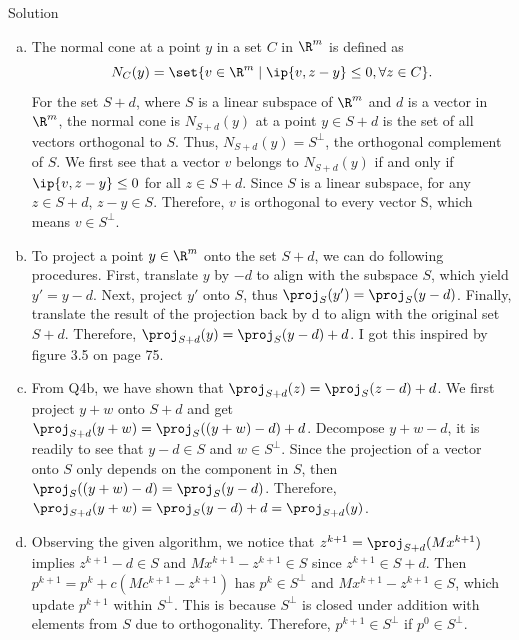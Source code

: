 \documentclass{article}
\theoremstyle{plain}
\theoremstyle{definition}
\theoremstyle{remark}
\begin{document}
\begin{solution}
    {Solution}
    \begin{enumerate}[(a)]
        \item The normal cone at a point $y$ in a set $C$ in $\R^m$ is defined as \[N_C(y)=\set{v\in\R^m \mid \ip{v, z-y}\leq 0, \forall z\in C}.\]
        For the set $S+d$, where $S$ is a linear subspace of $\R^m$ and $d$ is a vector in $\R^m$, the normal cone is $N_{S+d}(y)$ at a point $y\in S+d$ is the set of all vectors orthogonal to $S$. Thus, $N_{S+d}(y)=S^{\bot}$, the orthogonal complement of $S$. We first see that a vector $v$ belongs to $N_{S+d}(y)$ if and only if $\ip{v, z-y}\leq 0$ for all $z\in S+d$. Since $S$ is a linear subspace, for any $z\in S+d$, $z-y\in S$. Therefore, $v$ is orthogonal to every vector S, which means $v\in S^{\bot}$.
        \item To project a point $y\in\R^m$ onto the set $S+d$, we can do following procedures. First, translate $y$ by $-d$ to align with the subspace $S$, which yield $y'=y-d$. Next, project $y'$ onto $S$, thus $\proj_S(y')=\proj_S(y-d)$. Finally, translate the result of the projection back by d to align with the original set $S+d$. Therefore, $\proj_{S+d}(y)=\proj_S(y-d)+d$. I got this inspired by figure 3.5 on page 75.
        \item From Q4b, we have shown that $\proj_{S+d}(z)=\proj_S(z-d)+d$. We first project $y+w$ onto $S+d$ and get $\proj_{S+d}(y+w)=\proj_S((y+w)-d)+d$. Decompose $y+w-d$, it is readily to see that $y-d\in S$ and $w\in S^{\bot}$. Since the projection of a vector onto $S$ only depends on the component in $S$, then $\proj_S((y+w)-d)=\proj_S(y-d)$. Therefore, $\proj_{S+d}(y+w)=\proj_S(y-d)+d=\proj_{S+d}(y)$.
        \item Observing the given algorithm, we notice that $z^{k+1}=\proj_{S+d}(Mx^{k+1})$ implies $z^{k+1}-d\in S$ and $Mx^{k+1}-z^{k+1}\in S$ since $z^{k+1} \in S+d$. Then $p^{k+1}=p^k+c(Mc^{k+1}-z^{k+1})$ has $p^k\in S^{\bot}$ and $Mx^{k+1}-z^{k+1}\in S$, which update $p^{k+1}$ within $S^{\bot}$. This is because $S^{\bot}$ is closed under addition with elements from $S$ due to orthogonality. Therefore, $p^{k+1}\in S^{\bot}$ if $p^0\in S^{\bot}$.
    \end{enumerate}
\end{solution}
\end{document}

